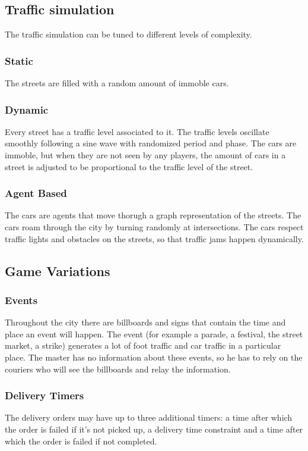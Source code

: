 \documentclass{article}
\begin{document}
\subsection{Traffic simulation}
\label{sec:traffic_sym_design}
The traffic simulation can be tuned to different levels of complexity.
\subsubsection{Static}
The streets are filled with a random amount of immoble cars.
\subsubsection{Dynamic}
Every street has a traffic level associated to it. The traffic levels oscillate smoothly following a sine wave with randomized period and phase. The cars are immoble, but when they are not seen by any players, the amount of cars in a street is adjusted to be proportional to the traffic level of the street.
\subsubsection{Agent Based}
The cars are agents that move thorugh a graph representation of the streets. The cars roam through the city by turning randomly at intersections. The cars respect traffic lights and obstacles on the streets, so that traffic jams happen dynamically.

\subsection{Game Variations}
\subsubsection{Events}
Throughout the city there are billboards and signs that contain the time and place an event will happen. The event (for example a parade, a festival, the street market, a strike) generates a lot of foot traffic and car traffic in a particular place. The master has no information about these events, so he has to rely on the couriers who will see the billboards and relay the information.
\subsubsection{Delivery Timers}
The delivery orders may have up to three additional timers: a time after which the order is failed if it's not picked up, a delivery time constraint and a time after which the order is failed if not completed.
\end{document}
